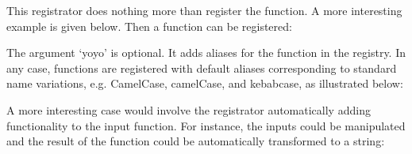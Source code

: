 \documentclass[letterpaper,10pt,english]{sphinxmanual}
\begin{document}
\begin{fulllineitems}
This registrator does nothing more than register the function. A more
interesting example is given below. Then a function can be registered:

\begin{sphinxVerbatim}[commandchars=\\\{\}]
  
       
\end{sphinxVerbatim}

The argument ‘yoyo’ is optional. It adds aliases for the function in the
registry. In any case, functions are registered with default aliases
corresponding to standard name variations, e.g. CamelCase, camelCase,
and kebab\sphinxhyphen{}case, as illustrated below:

\begin{sphinxVerbatim}[commandchars=\\\{\}]
\PYG{p}{[}\PYG{p}{]}  
\PYG{p}{[}\PYG{p}{]}  
\PYG{p}{[}\PYG{p}{]}  
\end{sphinxVerbatim}

A more interesting case would involve the registrator automatically
adding functionality to the input function. For instance, the inputs
could be manipulated and the result of the function could be
automatically transformed to a string:


\end{fulllineitems}
\end{document}
